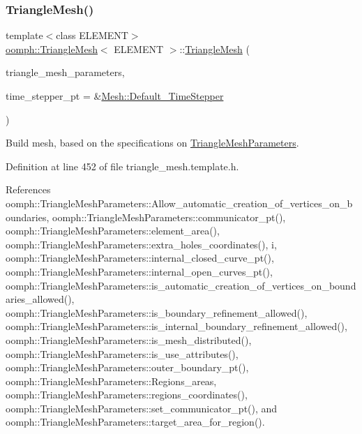 \subsubsection{\texorpdfstring{Triangle\+Mesh()}{TriangleMesh()}\hspace{0.1cm}{\footnotesize\ttfamily [3/5]}}
{\footnotesize\ttfamily template$<$class E\+L\+E\+M\+E\+NT$>$ \\
\hyperlink{classoomph_1_1TriangleMesh}{oomph\+::\+Triangle\+Mesh}$<$ E\+L\+E\+M\+E\+NT $>$\+::\hyperlink{classoomph_1_1TriangleMesh}{Triangle\+Mesh} (\begin{DoxyParamCaption}\item[{\hyperlink{classoomph_1_1TriangleMeshParameters}{Triangle\+Mesh\+Parameters} \&}]{triangle\+\_\+mesh\+\_\+parameters,  }\item[{\hyperlink{classoomph_1_1TimeStepper}{Time\+Stepper} $\ast$}]{time\+\_\+stepper\+\_\+pt = {\ttfamily \&\hyperlink{classoomph_1_1Mesh_a12243d0fee2b1fcee729ee5a4777ea10}{Mesh\+::\+Default\+\_\+\+Time\+Stepper}} }\end{DoxyParamCaption})\hspace{0.3cm}{\ttfamily [inline]}}



Build mesh, based on the specifications on \hyperlink{classoomph_1_1TriangleMeshParameters}{Triangle\+Mesh\+Parameters}. 



Definition at line 452 of file triangle\+\_\+mesh.\+template.\+h.



References oomph\+::\+Triangle\+Mesh\+Parameters\+::\+Allow\+\_\+automatic\+\_\+creation\+\_\+of\+\_\+vertices\+\_\+on\+\_\+boundaries, oomph\+::\+Triangle\+Mesh\+Parameters\+::communicator\+\_\+pt(), oomph\+::\+Triangle\+Mesh\+Parameters\+::element\+\_\+area(), oomph\+::\+Triangle\+Mesh\+Parameters\+::extra\+\_\+holes\+\_\+coordinates(), i, oomph\+::\+Triangle\+Mesh\+Parameters\+::internal\+\_\+closed\+\_\+curve\+\_\+pt(), oomph\+::\+Triangle\+Mesh\+Parameters\+::internal\+\_\+open\+\_\+curves\+\_\+pt(), oomph\+::\+Triangle\+Mesh\+Parameters\+::is\+\_\+automatic\+\_\+creation\+\_\+of\+\_\+vertices\+\_\+on\+\_\+boundaries\+\_\+allowed(), oomph\+::\+Triangle\+Mesh\+Parameters\+::is\+\_\+boundary\+\_\+refinement\+\_\+allowed(), oomph\+::\+Triangle\+Mesh\+Parameters\+::is\+\_\+internal\+\_\+boundary\+\_\+refinement\+\_\+allowed(), oomph\+::\+Triangle\+Mesh\+Parameters\+::is\+\_\+mesh\+\_\+distributed(), oomph\+::\+Triangle\+Mesh\+Parameters\+::is\+\_\+use\+\_\+attributes(), oomph\+::\+Triangle\+Mesh\+Parameters\+::outer\+\_\+boundary\+\_\+pt(), oomph\+::\+Triangle\+Mesh\+Parameters\+::\+Regions\+\_\+areas, oomph\+::\+Triangle\+Mesh\+Parameters\+::regions\+\_\+coordinates(), oomph\+::\+Triangle\+Mesh\+Parameters\+::set\+\_\+communicator\+\_\+pt(), and oomph\+::\+Triangle\+Mesh\+Parameters\+::target\+\_\+area\+\_\+for\+\_\+region().

